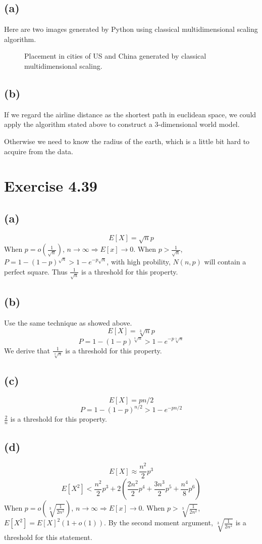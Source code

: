 \documentclass[paper=a4, fontsize=11pt]{scrartcl} %
\numberwithin{equation}{section} %
\numberwithin{figure}{section} %
\numberwithin{table}{section} %
\begin{document}
\subsection*{(a)}
Here are two images generated by Python using classical multidimensional scaling algorithm.
\begin{figure}[H]
\centering
	\caption{Placement in cities of US and China generated by classical multidimensional scaling.}
\end{figure}
\subsection*{(b)}
If we regard the airline distance as the shortest path in euclidean space, we could apply the algorithm stated above to construct a 3-dimensional world model.

Otherwise we need to know the radius of the earth, which is a little bit hard to acquire from the data. 
\section*{Exercise 4.39}
\subsection*{(a)}
$$E[X] = \sqrt{n}p $$
When $p = o\left(\frac{1}{\sqrt{n}}\right)$, $n\rightarrow \infty \Longrightarrow E[x] \rightarrow 0$.
When $p > \frac{1}{\sqrt{n}}$, $P = 1 - (1-p)^{\sqrt{n}} > 1 - e^{-p\sqrt{n}}$, with high probility, $N(n, p)$ will contain a perfect square.
Thus $\frac{1}{\sqrt{n}}$ is a threshold for this property.
\subsection*{(b)}
Use the same technique as showed above.
$$E[X] = \sqrt[3]{n}p $$
$$P = 1 - (1-p)^{\sqrt[3]{n}} > 1 - e^{-p\sqrt[3]{n}} $$
We derive that $\frac{1}{\sqrt[3]{n}}$ is a threshold for this property.
\subsection*{(c)}
$$E[X] = pn/2 $$
$$P = 1 - (1 - p)^{n/2} > 1 - e^{-pn/2} $$
$\frac{2}{n}$ is a threshold for this property. 
\subsection*{(d)}
$$E[X] \approx \frac{n^2}{2}p^3$$
$$E[X^2] < \frac{n^2}{2}p^3 + 2\left(\frac{2n^2}{2} p^4 + \frac{3n^3}{2} p^5 + \frac{n^4}{8}p^6\right) $$
When $p = o\left(\sqrt[3]{\frac{1}{2n^2}}\right)$, $n\rightarrow \infty \Longrightarrow E[x] \rightarrow 0$.
When $p > \sqrt[3]{\frac{1}{2n^2}}$, $E[X^2] = E[X]^2\left(1 + o(1)\right)$.
By the second moment argument, $\sqrt[3]{\frac{1}{2n^2}}$ is a threshold for this statement.
\end{document}

